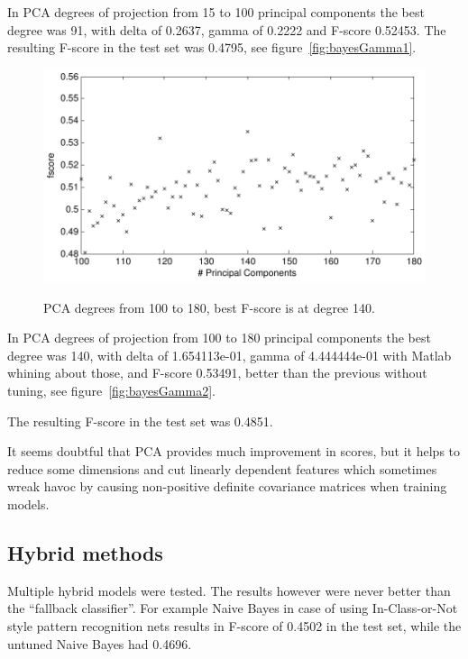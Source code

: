 \documentclass[a4paper,10pt]{article}
\begin{document}
In PCA degrees of projection from 15 to 100 principal components the best degree was 91, with delta of 0.2637, gamma of 0.2222 and F-score 0.52453. The resulting F-score in the test set was 0.4795, see figure~\ref{fig:bayesGamma1}.

\begin{figure}
\begin{center}
	\caption{PCA degrees from 100 to 180, best F-score is at degree 140.}
	{\includegraphics[scale=0.5,angle=0]{./img/bayes_gamma_pca2.pdf}}
	\label{fig:BayesGamma2}
\end{center}
\end{figure}

In PCA degrees of projection from 100 to 180 principal components the best degree was 140, with delta of 1.654113e-01, gamma of 4.444444e-01 with Matlab whining about those, and F-score 0.53491, better than the previous without tuning, see figure~\ref{fig:bayesGamma2}.

The resulting F-score in the test set was 0.4851.

It seems doubtful that PCA provides much improvement in scores, but it helps to reduce some dimensions and cut linearly dependent features which sometimes wreak havoc by causing non-positive definite covariance matrices when training models.

\subsection{Hybrid methods}

Multiple hybrid models were tested. The results however were never better than the “fallback classifier”. For example Naive Bayes in case of using In-Class-or-Not style pattern recognition nets results in F-score of 0.4502 in the test set, while the untuned Naive Bayes had 0.4696. 
\end{document}
